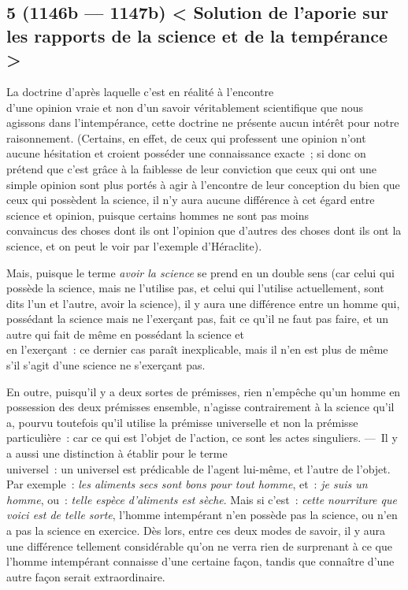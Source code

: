 \documentclass[french,twoside]{book} %
\begin{document}
\subsection[{5 (1146b — 1147b) < Solution de l’aporie sur les rapports de la science et de la tempérance >}]{5 (1146b — 1147b) < Solution de l’aporie sur les rapports de la science et de la tempérance >}
\noindent La doctrine d’après laquelle c’est en réalité à l’encontre \\
d’une opinion vraie et non d’un savoir véritablement scientifique que nous agissons dans l’intempérance, cette doctrine ne présente aucun intérêt pour notre raisonnement. (Certains, en effet, de ceux qui professent une opinion n’ont aucune hésitation et croient posséder une connaissance exacte ; si donc on prétend que c’est grâce à la faiblesse de leur conviction que ceux qui ont une simple opinion sont plus portés à agir à l’encontre de leur conception du bien que ceux qui possèdent la science, il n’y aura aucune différence à cet égard entre science et opinion, puisque certains hommes ne sont pas moins \\
convaincus des choses dont ils ont l’opinion que d’autres des choses dont ils ont la science, et on peut le voir par l’exemple d’Héraclite).\par
Mais, puisque le terme {\itshape avoir la science} se prend en un double sens (car celui qui possède la science, mais ne l’utilise pas, et celui qui l’utilise actuellement, sont dits l’un et l’autre, avoir la science), il y aura une différence entre un homme qui, possédant la science mais ne l’exerçant pas, fait ce qu’il ne faut pas faire, et un autre qui fait de même en possédant la science et \\
en l’exerçant : ce dernier cas paraît inexplicable, mais il n’en est plus de même s’il s’agit d’une science ne s’exerçant pas.\par
 En outre, puisqu’il y a deux sortes de prémisses, rien n’empêche qu’un homme en possession des deux prémisses ensemble, n’agisse contrairement à la science qu’il a, pourvu toutefois qu’il utilise la prémisse universelle et non la prémisse particulière : car ce qui est l’objet de l’action, ce sont les actes singuliers. — Il y a aussi une distinction à établir pour le terme \\
universel : un universel est prédicable de l’agent lui-même, et l’autre de l’objet. Par exemple : {\itshape les aliments secs sont bons pour tout homme}, et : {\itshape je suis un homme}, ou : {\itshape telle espèce d’aliments est sèche}. Mais si c’est : {\itshape cette nourriture que voici est de telle sorte}, l’homme intempérant n’en possède pas la science, ou n’en a pas la science en exercice. Dès lors, entre ces deux modes de savoir, il y aura une différence tellement considérable qu’on ne verra rien de surprenant à ce que l’homme intempérant connaisse d’une certaine façon, tandis que connaître d’une autre façon serait extraordinaire.\par
\end{document}
